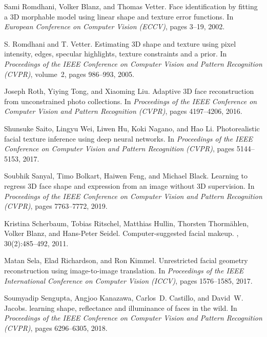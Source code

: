 \documentclass[final]{cvpr}
\begin{document}
{\begin{thebibliography}{10}
Sami Romdhani, Volker Blanz, and Thomas Vetter.
\newblock Face identification by fitting a {3D} morphable model using linear
  shape and texture error functions.
\newblock In {\em European Conference on Computer Vision (ECCV)}, pages 3--19,
  2002.

S. Romdhani and T. Vetter.
\newblock Estimating {3D} shape and texture using pixel intensity, edges,
  specular highlights, texture constraints and a prior.
\newblock In {\em Proceedings of the IEEE Conference on Computer Vision and
  Pattern Recognition (CVPR)}, volume~2, pages 986--993, 2005.

Joseph Roth, Yiying Tong, and Xiaoming Liu.
\newblock Adaptive {3D} face reconstruction from unconstrained photo
  collections.
\newblock In {\em Proceedings of the IEEE Conference on Computer Vision and
  Pattern Recognition (CVPR)}, pages 4197--4206, 2016.

Shunsuke Saito, Lingyu Wei, Liwen Hu, Koki Nagano, and Hao Li.
\newblock Photorealistic facial texture inference using deep neural networks.
\newblock In {\em Proceedings of the IEEE Conference on Computer Vision and
  Pattern Recognition (CVPR)}, pages 5144--5153, 2017.

Soubhik Sanyal, Timo Bolkart, Haiwen Feng, and Michael Black.
\newblock Learning to regress {3D} face shape and expression from an image
  without {3D} supervision.
\newblock In {\em Proceedings of the IEEE Conference on Computer Vision and
  Pattern Recognition (CVPR)}, pages 7763--7772, 2019.

Kristina Scherbaum, Tobias Ritschel, Matthias Hullin, Thorsten Thorm{\"a}hlen,
  Volker Blanz, and Hans-Peter Seidel.
\newblock Computer-suggested facial makeup.
, 30(2):485--492, 2011.

Matan Sela, Elad Richardson, and Ron Kimmel.
\newblock Unrestricted facial geometry reconstruction using image-to-image
  translation.
\newblock In {\em Proceedings of the IEEE International Conference on Computer
  Vision (ICCV)}, pages 1576--1585, 2017.

Soumyadip Sengupta, Angjoo Kanazawa, Carlos~D. Castillo, and David~W. Jacobs.
 learning shape, reflectance and illuminance of faces in the
  wild.
\newblock In {\em Proceedings of the IEEE Conference on Computer Vision and
  Pattern Recognition (CVPR)}, pages 6296--6305, 2018.


\end{thebibliography}}
\end{document}

